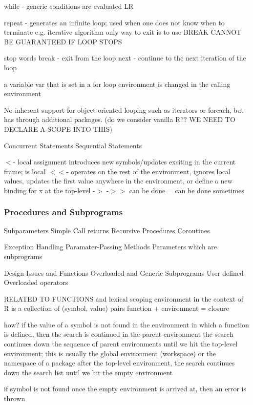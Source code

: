 \documentclass[12pt]{article}
\begin{document}
while - generic
conditions are evaluated LR

repeat - generates an infinite loop; used when one does not know when to terminate e.g. iterative algorithm
only way to exit is to use BREAK
CANNOT BE GUARANTEED IF LOOP STOPS

stop words
break - exit from the loop
next - continue to the next iteration of the loop

a variable var that is set in a for loop environment is changed in the calling environment

No inherent support for object-oriented looping such as iterators or foreach, but has through additional packages. (do we consider vanilla R?? WE NEED TO DECLARE A SCOPE INTO THIS)


Concurrent Statements
Sequential Statements

\(<\)- local assignment introduces new symbols/updates exsiting in the current frame; is local
\(<<\)- operates on the rest of the environment, ignores local values, updates the first value anywhere in the environment, or define a new binding for x at the top-level
-\(>\) -\(>>\) can be done
= can be done sometimes

\subsubsection{Procedures and Subprograms}
Subparameters
Simple Call returns
Recursive Procedures
Coroutines

Exception Handling
Paramater-Passing Methods
Parameters which are subprograms

Design Issues and Functions
Overloaded and Generic Subprograms
User-defined Overloaded operators


RELATED TO FUNCTIONS and lexical scoping
 environment in the context of R is a collection of (symbol, value) pairs
 function + environment = closure

 how?
 if the value of a symbol is not found in the environment in which a function is defined, then the search is continued in the parent environment
 the search continues down the sequence of parent environments until we hit the top-level environment; this is usually the global environment (workspace) or the namespace of a package
 after the top-level environment, the search continues down the search list until we hit the empty environment

 if symbol is not found once the empty environment is arrived at, then an error is thrown
\end{document}
